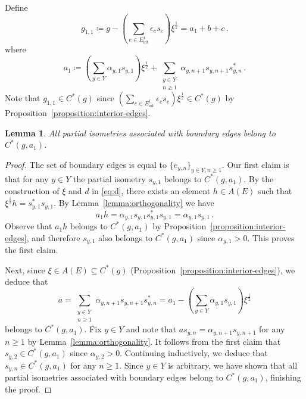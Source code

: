 \documentclass[12pt, a4paper]
{amsart}
\newtheorem{lemma}[thm]{Lemma}
\theoremstyle{definition}
\theoremstyle{remark}
\numberwithin{equation}{section}
\newcommand{\edgeint}{E^1_{\mathrm{int}}}
\newcommand{\Cstar}{\ensuremath{C^*}}
\begin{document}
\vspace{0.3cm}
Define
\begin{equation}\label{eq:g11}
g_{1,1} \coloneq g - \left( \sum_{e \in \edgeint} \epsilon_e s_e \right)\xi^{\frac{1}{2}} = a_1 + b + c\,.
\end{equation}
where
\begin{equation}\label{eq:a_1}
    a_1 \coloneq \left( \sum_{y \in Y} \alpha_{y,1} s_{y,1} \right)\xi^{\frac{1}{2}} + \sum_{\substack{y \in Y \\ n \ge 1}} \alpha_{y,n+1} s_{y,n+1} s_{y,n}^*\,.
\end{equation}
Note that $g_{1,1} \in C^*(g)$ since $\left( \sum_{e \in \edgeint} \epsilon_e s_e \right)\xi^{\frac{1}{2}} \in \Cstar(g)$ by Proposition~\ref{proposition:interior-edges}.
\begin{lemma}\label{lemma:boundary-edges}
    All partial isometries associated with boundary edges belong to $\Cstar(g, a_1)$.
\end{lemma}

\begin{proof}
    The set of boundary edges is equal to $\{e_{y,n}\}_{y \in Y, n \ge 1}$. Our first claim is that for any $y \in Y$ the partial isometry $s_{y,1}$ belongs to $\Cstar(g, a_1)$. By the construction of $\xi$ and $d$ in \eqref{eq:d}, there exists an element $h \in A(E)$ such that $\xi^{\frac{1}{2}}h= s_{y,1}^* s_{y,1}$. By Lemma~\ref{lemma:orthogonality} we have
    \begin{equation}
    a_1h = \alpha_{y,1} s_{y,1}s_{y,1}^* s_{y,1} = \alpha_{y,1} s_{y,1}\,.
    \end{equation}
    Observe that $a_1h$ belongs to $\Cstar(g, a_1)$ by Proposition~\ref{proposition:interior-edges}, and therefore $s_{y,1}$ also belongs to $\Cstar(g, a_1)$ since $\alpha_{y,1} >0$. This proves the first claim.

    Next, since $\xi \in A(E) \subseteq \Cstar(g)$ (Proposition~\ref{proposition:interior-edges}), we deduce that
    \begin{equation}
    a = \sum_{\substack{y \in Y \\ n \ge 1}} \alpha_{y,n+1} s_{y,n+1} s_{y,n}^* = a_1 - \left( \sum_{y \in Y} \alpha_{y,1} s_{y,1} \right)\xi^{\frac{1}{2}}
    \end{equation}
    belongs to $\Cstar(g, a_1)$. Fix $y \in Y$ and note that ${a s_{y,n} = \alpha_{y,n+1} s_{y,n+1}}$ for any $n \ge 1$ by Lemma~\ref{lemma:orthogonality}. It follows from the first claim that $s_{y,2} \in \Cstar(g, a_1)$ since $\alpha_{y,2} > 0$. Continuing inductively, we deduce that $s_{y,n} \in \Cstar(g, a_1)$ for any $n \ge 1$. Since $y \in Y$ is arbitrary, we have shown that all partial isometries associated with boundary edges belong to $\Cstar(g, a_1)$, finishing the proof.
\end{proof}
\end{document}
